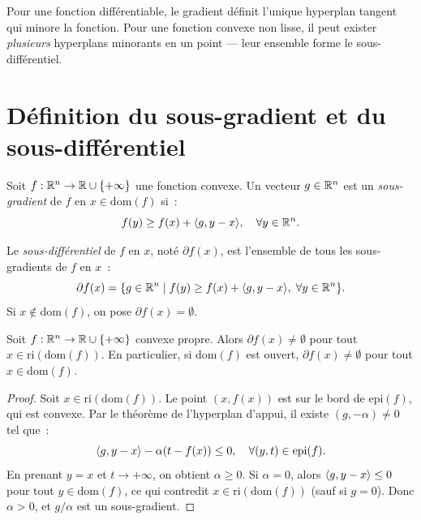 \begin{intuition}
Pour une fonction diff\'erentiable, le gradient d\'efinit l'unique hyperplan tangent
qui minore la fonction. Pour une fonction convexe non lisse, il peut exister
\emph{plusieurs} hyperplans minorants en un point --- leur ensemble forme le
sous-diff\'erentiel.
\end{intuition}

\section{D\'efinition du sous-gradient et du sous-diff\'erentiel}

\begin{definition}
Soit $f : \mathbb{R}^n \to \mathbb{R} \cup \{+\infty\}$ une fonction convexe. Un vecteur
$g \in \mathbb{R}^n$ est un \emph{sous-gradient} de $f$ en $x \in \mathrm{dom}(f)$ si~:
\[
    f(y) \geq f(x) + \langle g, y - x \rangle, \quad \forall y \in \mathbb{R}^n.
\]
\end{definition}

\begin{definition}
Le \emph{sous-diff\'erentiel} de $f$ en $x$, not\'e $\partial f(x)$, est l'ensemble
de tous les sous-gradients de $f$ en $x$~:
\[
    \partial f(x) = \{g \in \mathbb{R}^n \mid f(y) \geq f(x) + \langle g, y-x \rangle, \; \forall y \in \mathbb{R}^n\}.
\]
Si $x \notin \mathrm{dom}(f)$, on pose $\partial f(x) = \emptyset$.
\end{definition}

\begin{theoreme}
\label{thm:existence_sg}
Soit $f : \mathbb{R}^n \to \mathbb{R} \cup \{+\infty\}$ convexe propre. Alors $\partial f(x) \neq \emptyset$
pour tout $x \in \mathrm{ri}(\mathrm{dom}(f))$. En particulier, si $\mathrm{dom}(f)$
est ouvert, $\partial f(x) \neq \emptyset$ pour tout $x \in \mathrm{dom}(f)$.
\end{theoreme}

\begin{proof}
Soit $x \in \mathrm{ri}(\mathrm{dom}(f))$. Le point $(x, f(x))$ est sur le bord de
$\mathrm{epi}(f)$, qui est convexe. Par le th\'eor\`eme de l'hyperplan d'appui,
il existe $(g, -\alpha) \neq 0$ tel que~:
\[
    \langle g, y - x \rangle - \alpha(t - f(x)) \leq 0, \quad \forall (y,t) \in \mathrm{epi}(f).
\]
En prenant $y = x$ et $t \to +\infty$, on obtient $\alpha \geq 0$. Si $\alpha = 0$,
alors $\langle g, y-x \rangle \leq 0$ pour tout $y \in \mathrm{dom}(f)$, ce qui contredit
$x \in \mathrm{ri}(\mathrm{dom}(f))$ (sauf si $g = 0$). Donc $\alpha > 0$, et
$g/\alpha$ est un sous-gradient.
\end{proof}

